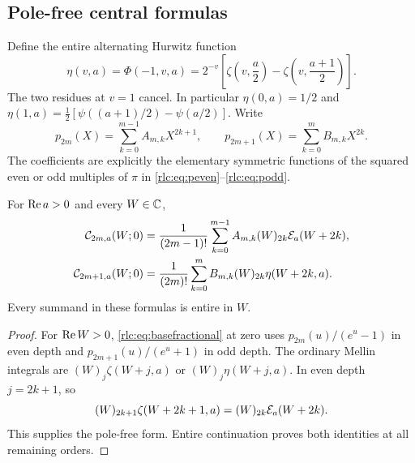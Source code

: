 \subsection{Pole-free central formulas}
Define the entire alternating Hurwitz function
\begin{equation}\label{rlc:eq:eta}
 \eta(v,a)=\Phi(-1,v,a)
 =2^{-v}\left[\zeta\left(v,\frac a2\right)
                -\zeta\left(v,\frac{a+1}2\right)\right].
\end{equation}
The two residues at $v=1$ cancel. In particular
$\eta(0,a)=1/2$ and
$\eta(1,a)=\tfrac12[\psi((a+1)/2)-\psi(a/2)]$.
Write
\[
 p_{2m}(X)=\sum_{k=0}^{m-1}A_{m,k}X^{2k+1},\qquad
 p_{2m+1}(X)=\sum_{k=0}^{m}B_{m,k}X^{2k}.
\]
The coefficients are explicitly the elementary symmetric functions
of the squared even or odd multiples of $\pi$ in
\eqref{rlc:eq:peven}--\eqref{rlc:eq:podd}.

\begin{theorem}\label{rlc:thm:central}
For $\operatorname{Re} a>0$ and every $W\in\mathbb C$,
\begin{align}
 \mathcal C_{2m,a}(W;0)
 &=\frac1{(2m-1)!}\sum_{k=0}^{m-1}
       A_{m,k}(W)_{2k}\mathcal E_a(W+2k),\label{rlc:eq:evencentral}\\
 \mathcal C_{2m+1,a}(W;0)
 &=\frac1{(2m)!}\sum_{k=0}^{m}
       B_{m,k}(W)_{2k}\eta(W+2k,a).\label{rlc:eq:oddcentral}
\end{align}
Every summand in these formulas is entire in $W$.
\end{theorem}
\begin{proof}
For $\operatorname{Re} W>0$, \eqref{rlc:eq:basefractional} at zero uses
$p_{2m}(u)/(e^u-1)$ in even depth and $p_{2m+1}(u)/(e^u+1)$
in odd depth. The ordinary Mellin integrals are
$(W)_j\zeta(W+j,a)$ or $(W)_j\eta(W+j,a)$.
In even depth $j=2k+1$, so
\[
 (W)_{2k+1}\zeta(W+2k+1,a)
     =(W)_{2k}\mathcal E_a(W+2k).
\]
This supplies the pole-free form. Entire continuation proves both
identities at all remaining orders.
\end{proof}

